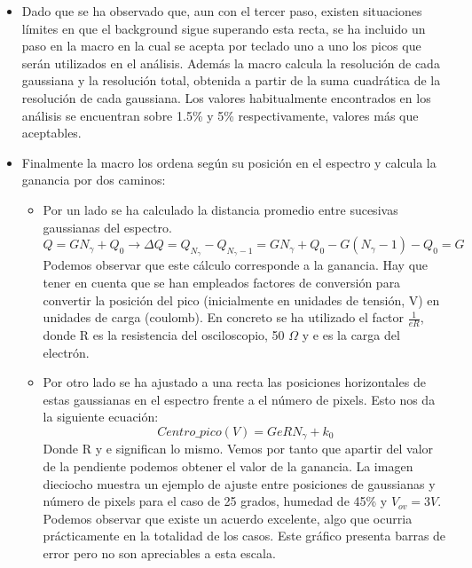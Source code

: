 \begin{itemize}
\item {} Dado que se ha observado que, aun con el tercer paso, existen situaciones límites en que el background sigue superando esta recta, se ha incluido un paso en la macro en la cual se acepta por teclado uno a uno los picos que serán utilizados en el análisis. Además la macro calcula la resolución de cada gaussiana y la resolución total, obtenida a partir de la suma cuadrática de la resolución de cada gaussiana. Los valores habitualmente encontrados en los análisis se encuentran sobre 1.5\% y 5\% respectivamente, valores más que aceptables.

\item {} Finalmente la macro los ordena según su posición en el espectro y calcula la ganancia por dos caminos:
	\begin{itemize}

	\item {} Por un lado se ha calculado la distancia promedio entre sucesivas gaussianas del espectro. 
	$$Q = G N_\gamma + Q_0 \longrightarrow \Delta Q= Q_{N_\gamma} - Q_{N_\gamma -1}=G N_\gamma+ Q_0 - G(N_		\gamma -1) - Q_0 = G$$
	Podemos observar que este cálculo corresponde a la ganancia. Hay que tener en cuenta que se han 			empleados factores de conversión para convertir la posición del pico (inicialmente en unidades de			tensión, V) en unidades de carga (coulomb). En concreto se ha utilizado el factor $\frac{1}{eR}$, 			donde R es la resistencia del osciloscopio, 50 $\Omega$ y e es la carga del electrón.
	
	\item {} Por otro lado se ha ajustado a una recta las posiciones horizontales de estas gaussianas en el 	espectro frente a el número de pixels. Esto nos da la siguiente ecuación:
	$$Centro\_pico(V) = GeRN_\gamma + k_0$$	
	Donde R y e significan lo mismo. Vemos por tanto que apartir del valor de la pendiente podemos obtener 		el valor de la ganancia. La imagen dieciocho muestra un ejemplo de ajuste entre posiciones de 				gaussianas y número de pixels para el caso de 25 grados, humedad de 45\% y $V_{ov}=3V$. Podemos 			observar que existe	un acuerdo excelente, algo que ocurria prácticamente en la totalidad de los casos. 		Este gráfico presenta barras de error pero no son apreciables a esta escala.
		

\end{itemize}
\end{itemize}
